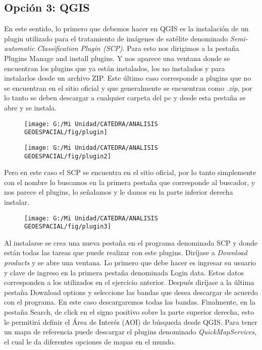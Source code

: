 \documentclass[a4paper,oneside,11pt,]{article}
\begin{document}
\subsection{Opción 3: QGIS}
En este sentido, lo primero que debemos hacer en QGIS es la instalación de un plugin utilizado para el tratamiento de imágenes de satélite denominado \emph{Semi-automatic Classification Plugin (SCP)}. Para esto nos dirigimos a la pestaña Plugins Manage and install plugins. Y nos aparece una ventana donde se encuentran los plugins que ya están instalados, los no instalados y para instalarlos desde un archivo ZIP. Este último caso corresponde a plugins que no se encuentran en el sitio oficial y que generalmente se encuentran como \emph{.zip}, por lo tanto se deben descargar a cualquier carpeta del pc y desde esta pestaña se abre y se instala.

\begin{figure}
\centering
\texttt{[image: G:/Mi Unidad/CATEDRA/ANALISIS GEOESPACIAL/fig/plugin]}
\end{figure}

\begin{figure}
\centering
\texttt{[image: G:/Mi Unidad/CATEDRA/ANALISIS GEOESPACIAL/fig/plugin2]}
\end{figure}

Pero en este caso el SCP se encuentra en el sitio oficial, por lo tanto simplemente con el nombre lo buscamos en la primera pestaña que corresponde al buscador, y nos parece el plugins, lo señalamos y le damos en la parte inferior derecha instalar.

\begin{figure}
\centering
\texttt{[image: G:/Mi Unidad/CATEDRA/ANALISIS GEOESPACIAL/fig/plugin3]}
\end{figure}

Al instalarse se crea una nueva pestaña en el programa denominada SCP y donde están todas las tareas que puede realizar con este plugins. Diríjase a \emph{Download products} y se abre una ventana. Lo primero que debe hacer es ingresar su usuario y clave de ingreso en la primera pestaña denominada Login data. Estos datos corresponden a los utilizados en el ejercicio anterior. Después diríjase a la última pestaña Download options y seleccione las bandas que desea descargar de acuerdo con el programa. En este caso descargaremos todas las bandas.
Finalmente, en la pestaña Search, de click en el signo positivo sobre la parte superior derecha, esto le permitirá definir el Área de Interés (AOI) de búsqueda desde QGIS. Para tener un mapa de referencia puede descargar el plugins denominado \emph{QuickMapServices}, el cual le da diferentes opciones de mapas en el mundo. 
\end{document}
